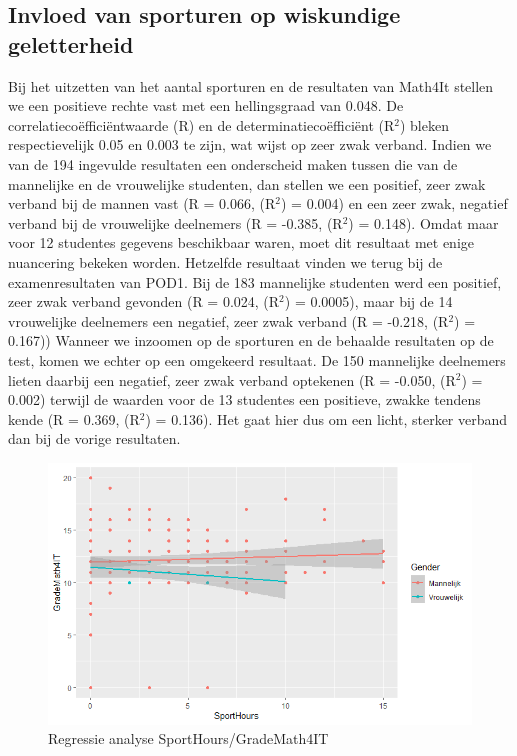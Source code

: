 \documentclass{hogent-article}
\begin{document}
\subsection{Invloed van sporturen op wiskundige geletterheid}
Bij het uitzetten van het aantal sporturen en de resultaten van Math4It stellen we een positieve rechte vast met een hellingsgraad van 0.048. De correlatiecoëfficiëntwaarde (R) en de determinatiecoëfficiënt (R$^{2}$) bleken respectievelijk 0.05 en 0.003 te zijn, wat wijst op zeer zwak verband. Indien we van de 194 ingevulde resultaten een onderscheid maken tussen die van de mannelijke en de vrouwelijke studenten, dan stellen we een positief, zeer zwak verband bij de mannen vast (R = 0.066, (R$^{2}$) = 0.004) en een zeer zwak, negatief verband bij de vrouwelijke deelnemers (R = -0.385, (R$^{2}$) = 0.148). Omdat maar voor 12 studentes gegevens beschikbaar waren, moet dit resultaat met enige nuancering bekeken worden.
Hetzelfde resultaat vinden we terug bij de examenresultaten van POD1. Bij de 183 mannelijke studenten werd een positief, zeer zwak verband gevonden (R = 0.024, (R$^{2}$) = 0.0005), maar bij de 14 vrouwelijke deelnemers een negatief, zeer zwak verband (R = -0.218, (R$^{2}$) = 0.167))
Wanneer we inzoomen op de sporturen en de behaalde resultaten op de test, komen we echter op een omgekeerd resultaat. De 150 mannelijke deelnemers lieten daarbij een negatief, zeer zwak verband optekenen (R = -0.050, (R$^{2}$) = 0.002) terwijl de waarden voor de 13 studentes een positieve, zwakke tendens kende (R = 0.369, (R$^{2}$) = 0.136). Het gaat hier dus om een licht, sterker verband dan bij de vorige resultaten.


\begin{figure}[ht]
    \begin{center}
        \includegraphics[width=\columnwidth]{SportMath4IT.png}
    \end{center}
    \caption{Regressie analyse SportHours/GradeMath4IT}
    \label{Regressie analyse SportHours/GradeMath4IT}
\end{figure}
\end{document}
